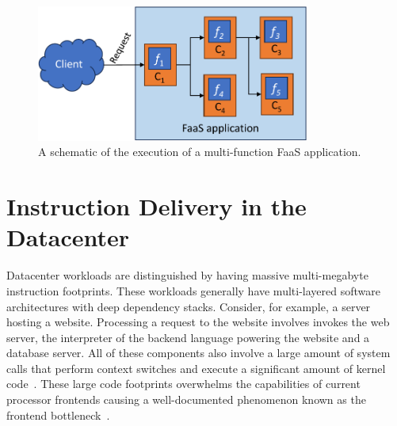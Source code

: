\documentclass[../main.tex]{subfiles}
\begin{document}
\begin{refsection}
\begin{figure}[ht]
  \centering
\includegraphics[width=0.8\textwidth]{papers/paper5-cofaas/figures/faas_application.pdf}
\caption{\label{fig:faas-app} A schematic of the execution of a multi-function FaaS application.}
\end{figure}

\section{Instruction Delivery in the Datacenter}
\label{sec:instr-delivery}

\label{sec:btb-background}


Datacenter workloads are distinguished by having massive
multi-megabyte instruction footprints. These workloads generally have
multi-layered software architectures with deep dependency
stacks. Consider, for example, a server hosting a website. Processing
a request to the website involves invokes the web server, the
interpreter of the backend language powering the website and a
database server. All of these components also involve a large amount
of system calls that perform context switches and execute a
significant amount of kernel
code~\cite{ferdman12_clear_cloud,ailamaki99_dbmss_moder_proces}. These
large code footprints overwhelms the capabilities of current processor
frontends causing a well-documented phenomenon known as the frontend
bottleneck~\cite{kanev15_profil,ferdman12_clear_cloud,ayers19_asmdb,kanev15_profil,kumar17_boomer,kumar18_blast_throug_front_end_bottl_with_shotg,kumar20_shoot_down_server_front_end_bottl,spracklen05_effec_instr_prefet_chip_multip}.



\end{refsection}
\end{document}
